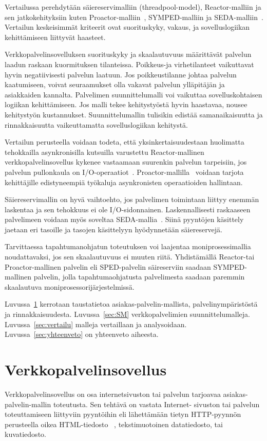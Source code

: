 \documentclass[finnish]{tktltiki2}
\theoremstyle{definition}
\theoremstyle{remark}
\begin{document}
Vertailussa perehdytään säiereservimalliin (threadpool-model), Reactor-malliin\cite{schmidt_reactor:_1995} ja sen jatkokehityksiin
kuten Proactor-malliin~\cite{hu_applying_1998}, SYMPED-malliin ja SEDA-malliin~\cite{welsh_seda_2001}.
Vertailun keskeisimmät kriteerit ovat suorituskyky, vakaus, ja
sovelluslogiikan kehittämiseen liittyvät haasteet.

Verkkopalvelinsovelluksen suorituskyky ja skaalautuvuus
määrittävät palvelun laadun raskaan kuormituksen tilanteissa.
Poikkeus-ja virhetilanteet vaikuttavat hyvin negatiivisesti
palvelun laatuun. Jos poikkeustilanne johtaa
palvelun kaatumiseen, voivat seuraamukset olla vakavat
palvelun ylläpitäjän ja asiakkaiden kannalta.
Palvelimen suunnittelumalli voi vaikuttaa 
sovelluskohtaisen logiikan kehittämiseen.
Jos malli tekee kehitystyöstä hyvin haastavaa,
nousee kehitystyön kustannukset.
Suunnittelumallin tulisikin edistää
samanaikaisuutta ja rinnakkaisuutta vaikeuttamatta
sovelluslogiikan kehitystä.

Vertailun perusteella voidaan todeta, että
yksinkertaisuudestaan huolimatta tehokkailla asynkronisilla
kutsuilla varustettu Reactor-mallinen verkkopalvelinsovellus
kykenee vastaamaan suurenkin palvelun tarpeisiin, jos palvelun
pullonkaula on I/O-operaatiot~\cite{schmidt_reactor:_1995}.
Proactor-mallilla~\cite{hu_applying_1998} voidaan tarjota kehittäjille edistyneempiä työkaluja
asynkronisten operaatioiden hallintaan.

Säiereservimallin on hyvä vaihtoehto, jos palvelimen
toimintaan liittyy enemmän laskentaa ja sen tehokkuus ei ole I/O-sidonnainen.
Laskennallisesti raskaaseen palvelimeen voidaan myös soveltaa SEDA-mallia~\cite{welsh_seda_2001}.
Siinä pyyntöjen käsittely jaetaan eri tasoille ja tasojen käsittelyyn
hyödynnetään säiereservejä.

Tarvittaessa tapahtumanohjatun toteutuksen voi laajentaa moniprosessimallia noudattavaksi,
jos sen skaalautuvuus ei muuten riitä.
Yhdistämällä Reactor-tai Proactor-mallinen palvelin eli SPED-palvelin säireserviin
saadaan SYMPED-mallinen palvelin, jolla tapahtumaohjatusta palvelimesta
saadaan paremmin skaalautuva moniprosessorijärjestelmissä.

Luvussa~\ref{vps} kerrotaan taustatietoa asiakas-palvelin-mallista, palvelinympäristöstä
ja rinnakkaisuudesta.
Luvussa~\ref{sec:SM} verkkopalvelimien suunnittelumalleja. Luvussa~\ref{sec:vertailu}
malleja vertaillaan ja analysoidaan. Luvussa~\ref{sec:yhteenveto} on yhteenveto aiheesta.

\section{Verkkopalvelinsovellus}\label{vps}
Verkkopalvelinsovellus on osa internetsivuston tai palvelun tarjoavaa
asiakas-palvelin-mallin toteutusta. 
Sen tehtävä on vastata Internet-
sivuston tai palvelun toteuttamiseen
liittyviin pyyntöihin eli lähettämään tietyn HTTP-pyynnön
perusteella oikea HTML-tiedosto~\cite{Berners-Lee_1994}
, tekstimuotoinen datatiedosto, tai kuvatiedosto.
\end{document}
